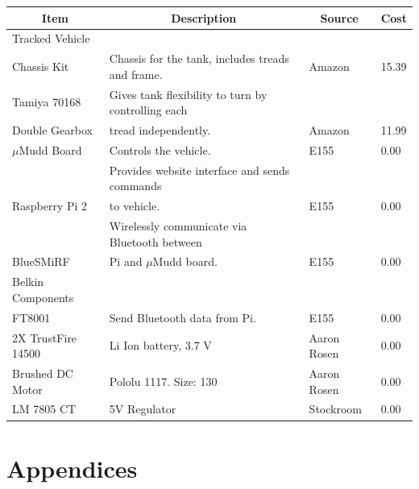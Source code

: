 \documentclass[12pt]{article}
\begin{document}
\begin{center}
\begin{tabular}{|l|l|l|l|}
\hline
\multicolumn{1}{|c|}{\textbf{Item}} & \multicolumn{1}{c|}{\textbf{Description}}               	& \multicolumn{1}{c|}{\textbf{Source}} & \multicolumn{1}{c|}{\textbf{Cost}} \\ \hline
Tracked Vehicle 			&										&							&	\\
			Chassis Kit	& Chassis for the tank, includes treads and frame.    	& Amazon 					& 15.39                          	\\ \hline
Tamiya 70168				& Gives tank flexibility to turn by controlling each     	& 							& \\
Double Gearbox			& tread independently.						& Amazon		               			& 11.99                             	\\ \hline
$\mu$Mudd Board                	& Controls the vehicle.                                                & E155                                 		& 0.00                               	\\ \hline
			                      	& Provides website interface and sends commands 	&							&\\
Raspberry Pi 2			    	& to vehicle.             							& E155                                 		& 0.00                               	\\ \hline
                        				& Wirelessly communicate via Bluetooth between  	&							&\\
BlueSMiRF				& Pi and $\mu$Mudd board.		 			& E155                                		& 0.00                               	\\ \hline
Belkin Components			&										&							&					\\ 
FT8001					& Send Bluetooth data from Pi.					& E155                                		& 0.00                               	\\ \hline
2X TrustFire 14500			& Li Ion battery, 3.7 V 						& Aaron Rosen					& 0.00				\\ \hline
Brushed DC Motor			& Pololu 1117. Size: 130						& Aaron Rosen					& 0.00				\\ \hline
LM 7805 CT				& 5V Regulator						& Stockroom					& 0.00				\\ \hline
\end{tabular}
\end{center}

\section{Appendices}
\end{document}
